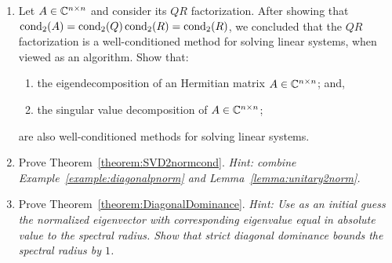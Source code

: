 \begin{enumerate}
\item Let $A\in\mathbb{C}^{n\times n}$ and consider its $QR$ factorization. After showing that $\operatorname{cond}_2(A) = \operatorname{cond}_2(Q)\operatorname{cond}_2(R) = \operatorname{cond}_2(R)$, we concluded that the $QR$ factorization is a well-conditioned method for solving linear systems, when viewed as an algorithm. Show that:
\begin{enumerate}
\item the eigendecomposition of an Hermitian matrix $A\in\mathbb{C}^{n\times n}$; and,
\item the singular value decomposition of $A\in\mathbb{C}^{n\times n}$;
\end{enumerate}
are also well-conditioned methods for solving linear systems.

\item Prove Theorem~\ref{theorem:SVD2normcond}. {\em Hint: combine Example~\ref{example:diagonalpnorm} and Lemma~\ref{lemma:unitary2norm}.}

\item Prove Theorem~\ref{theorem:DiagonalDominance}. {\em Hint: Use as an initial guess the normalized eigenvector with corresponding eigenvalue equal in absolute value to the spectral radius. Show that strict diagonal dominance bounds the spectral radius by $1$.}

\end{enumerate}